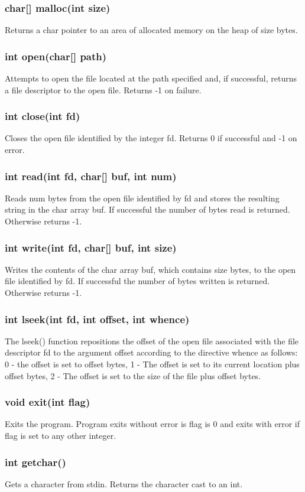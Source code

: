 \begin{homeworkProblem}
	\subsubsection{char[] malloc(int size)}
	Returns a char pointer to an area of allocated memory on the heap of size bytes.
	\subsubsection{int open(char[] path)}
	Attempts to open the file located at the path specified and, if successful, returns a file descriptor to the open file. Returns -1 on failure.
	\subsubsection{int close(int fd)}
	Closes the open file identified by the integer fd. Returns 0 if successful and -1 on error.
	\subsubsection{int read(int fd, char[] buf, int num)}
	Reads num bytes from the open file identified by fd and stores the resulting string in the char array buf. If successful the number of bytes read is returned. Otherwise returns -1.
	\subsubsection{int write(int fd, char[] buf, int size)}
	Writes the contents of the char array buf, which contains size bytes, to the open file identified by fd. If successful the number of bytes written is returned. Otherwise returns -1.
	\subsubsection{int lseek(int fd, int offset, int whence)}
	The lseek() function repositions the offset of the open file associated with the file descriptor fd to the argument offset according to the directive whence as follows: 0 - the offset is set to offset bytes, 1 - The offset is set to its current location plus offset bytes, 2 - The offset is set to the size of the file plus offset bytes.
	\subsubsection{void exit(int flag)}
	Exits the program. Program exits without error is flag is 0 and exits with error if flag is set to any other integer.
	\subsubsection{int getchar()}
	Gets a character from stdin. Returns the character cast to an int.

\end{homeworkProblem}
